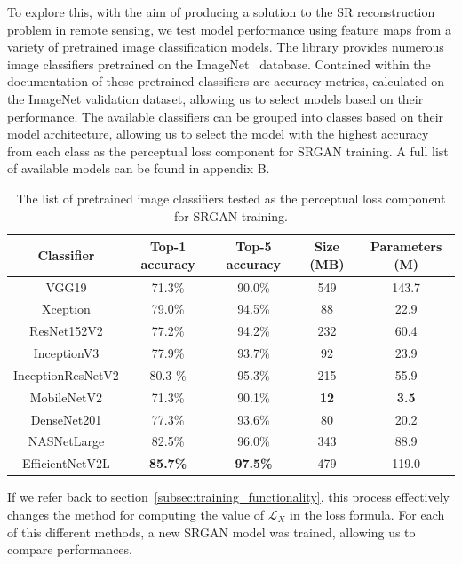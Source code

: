 To explore this, with the aim of producing a solution to the SR reconstruction problem in remote sensing, we test model performance using feature maps from a variety of pretrained image classification models. The  library provides numerous image classifiers pretrained on the ImageNet~\cite{imageNet} database. Contained within the documentation of these pretrained classifiers are accuracy metrics, calculated on the ImageNet validation dataset, allowing us to select models based on their performance. The available classifiers can be grouped into classes based on their model architecture, allowing us to select the model with the highest accuracy from each class as the perceptual loss component for SRGAN training. A full list of available models can be found in appendix B.
\begin{table}
    \centering
    \begin{tabular}{ccccc}
        \toprule
        \textbf{Classifier} & \textbf{Top-1 accuracy} & \textbf{Top-5 accuracy} & \textbf{Size (MB)} & \textbf{Parameters (M)} \\
        \midrule
        VGG19 & 71.3\% & 90.0\% & 549 & 143.7 \\
        Xception & 79.0\% & 94.5\% & 88 & 22.9 \\
        ResNet152V2 & 77.2\% & 94.2\% & 232 & 60.4 \\
        InceptionV3 & 77.9\% & 93.7\% & 92 & 23.9 \\
        InceptionResNetV2 & 80.3 \% & 95.3\% & 215 & 55.9 \\
        MobileNetV2 & 71.3\% & 90.1\% & \textbf{12} & \textbf{3.5} \\
        DenseNet201 & 77.3\% & 93.6\% & 80 & 20.2 \\
        NASNetLarge & 82.5\% & 96.0\% & 343 & 88.9 \\
    EfficientNetV2L & \textbf{85.7\%} & \textbf{97.5\%} & 479 & 119.0 \\
        \bottomrule
    \end{tabular}
    \caption{The list of pretrained image classifiers tested as the perceptual loss component for SRGAN training.}\label{table:pretrained_classifiers}
\end{table}

If we refer back to section~\ref{subsec:training_functionality}, this process effectively changes the method for computing the value of $\mathcal{L}_X$ in the loss formula. For each of this different methods, a new SRGAN model was trained, allowing us to compare performances.

